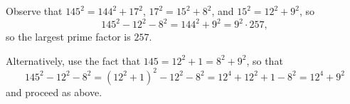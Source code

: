 Observe that $145^2=144^2+17^2$, $17^2=15^2+8^2$, and $15^2=12^2+9^2$, so \[145^2-12^2-8^2=144^2+9^2=9^2\cdot257,\] so the largest prime factor is $\boxed{257}$.

Alternatively, use the fact that $145=12^2+1=8^2+9^2$, so that \[145^2-12^2-8^2=\left(12^2+1\right)^2-12^2-8^2=12^4+12^2+1-8^2=12^4+9^2\] and proceed as above.